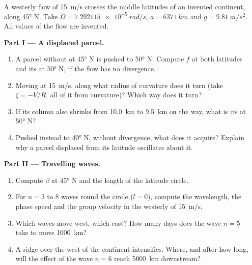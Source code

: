 \begin{problem}
\label{pb:b3:atmospheric-dynamics:1}
A westerly flow of \qty{15}{m/s} crosses the middle latitudes of an
invented continent, along \ang{45} N. Take $\Omega =
\qty{7.292115e-5}{rad/s}$, $a = \qty{6371}{km}$ and $g = \qty{9.81}{m/s^2}$.
All values of the flow are invented.

\medskip\noindent\textbf{Part I --- A displaced parcel.}
\begin{enumerate}
\item A parcel without  at \ang{45} N is pushed to
  \ang{50} N. Compute $f$ at both latitudes and its  at
  \ang{50} N, if the flow has no divergence.
\item Moving at \qty{15}{m/s}, along what radius of curvature does it turn
  (take $\zeta = -V/R$, all of it from curvature)? Which way does it turn?
\item If its column also shrinks from \qty{10.0}{km} to \qty{9.5}{km} on the
  way, what is its  at \ang{50} N?
\item Pushed instead to \ang{40} N, without divergence, what  does it acquire? Explain why a parcel displaced from its
  latitude oscillates about it.
\end{enumerate}

\medskip\noindent\textbf{Part II --- Travelling waves.}
\begin{enumerate}[resume]
\item Compute $\beta$ at \ang{45} N and the length of the latitude circle.
\item For $n = 3$ to 8 waves round the circle ($l = 0$), compute the
  wavelength, the phase speed and the group velocity in the westerly of
  \qty{15}{m/s}.
\item Which waves move west, which east? How many days does the wave
  $n = 5$ take to move \qty{1000}{km}?
\item A ridge over the west of the continent intensifies. Where, and after
  how long, will the effect of the wave $n = 6$ reach \qty{5000}{km}
  downstream?
\end{enumerate}


\end{problem}
